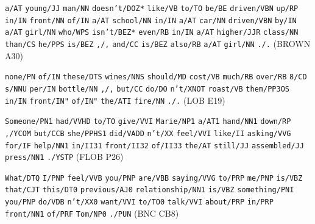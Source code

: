 \begin{exe}
\ex
\begin{xlist}
\label{ex:postagsets}
\ex \begin{minipage}[t]{0.85\textwidth} \raggedright \texttt{a/AT} \texttt{young/JJ} \texttt{man/NN} \texttt{doesn't/DOZ*} \texttt{like/VB} \texttt{to/TO} \texttt{be/BE} \texttt{driven/VBN} \texttt{up/RP} \texttt{in/IN} \texttt{front/NN} \texttt{of/IN} \texttt{a/AT} \texttt{school/NN} \texttt{in/IN} \texttt{a/AT} \texttt{car/NN} \texttt{driven/VBN} \texttt{by/IN} \texttt{a/AT} \texttt{girl/NN} \texttt{who/WPS} \texttt{isn't/BEZ*} \texttt{even/RB} \texttt{in/IN} \texttt{a/AT} \texttt{higher/JJR} \texttt{class/NN} \texttt{than/CS} \texttt{he/PPS} \texttt{is/BEZ} \texttt{,/,} \texttt{and/CC} \texttt{is/BEZ} \texttt{also/RB} \texttt{a/AT} \texttt{girl/NN} \texttt{./.} (BROWN A30) \end{minipage}
\ex \begin{minipage}[t]{0.85\textwidth} \raggedright \texttt{none/PN} \texttt{of/IN} \texttt{these/DTS} \texttt{wines/NNS} \texttt{should/MD} \texttt{cost/VB} \texttt{much/RB} \texttt{over/RB} \texttt{8/CD} \texttt{s/NNU} \texttt{per/IN} \texttt{bottle/NN} \texttt{,/,} \texttt{but/CC} \texttt{do/DO} \texttt{n't/XNOT} \texttt{roast/VB} \texttt{them/PP3OS} \texttt{in/IN} \texttt{front/IN"} \texttt{of/IN"} \texttt{the/ATI} \texttt{fire/NN} \texttt{./.} (LOB E19) \end{minipage}
\ex \begin{minipage}[t]{0.85\textwidth} \raggedright \texttt{Someone/PN1} \texttt{had/VVHD} \texttt{to/TO} \texttt{give/VVI} \texttt{Marie/NP1} \texttt{a/AT1} \texttt{hand/NN1} \texttt{down/RP} \texttt{,/YCOM} \texttt{but/CCB} \texttt{she/PPHS1} \texttt{did/VADD} \texttt{n't/XX} \texttt{feel/VVI} \texttt{like/II} \texttt{asking/VVG} \texttt{for/IF} \texttt{help/NN1} \texttt{in/II31} \texttt{front/II32} \texttt{of/II33} \texttt{the/AT} \texttt{still/JJ} \texttt{assembled/JJ} \texttt{press/NN1} \texttt{./YSTP} (FLOB P26) \end{minipage}
\ex \begin{minipage}[t]{0.85\textwidth} \raggedright \texttt{What/DTQ} \texttt{I/PNP} \texttt{feel/VVB} \texttt{you/PNP} \texttt{are/VBB} \texttt{saying/VVG} \texttt{to/PRP} \texttt{me/PNP} \texttt{is/VBZ} \texttt{that/CJT} \texttt{this/DT0} \texttt{previous/AJ0} \texttt{relationship/NN1} \texttt{is/VBZ} \texttt{something/PNI} \texttt{you/PNP} \texttt{do/VDB} \texttt{n't/XX0} \texttt{want/VVI} \texttt{to/TO0} \texttt{talk/VVI} \texttt{about/PRP} \texttt{in/PRP} \texttt{front/NN1} \texttt{of/PRF} \texttt{Tom/NP0} \texttt{./PUN} (BNC CB8) \end{minipage}
\end{xlist}
\end{exe}


